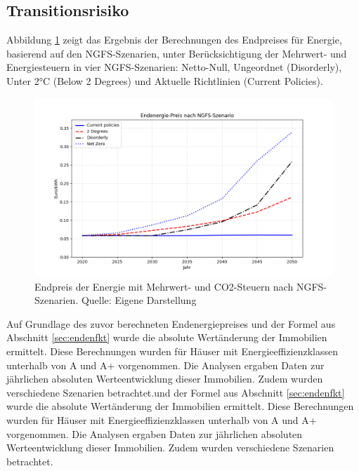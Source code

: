 








\subsection{Transitionsrisiko}
Abbildung \ref{fig:endpreis_energie} zeigt das Ergebnis der Berechnungen des Endpreises für Energie, basierend auf den NGFS-Szenarien, unter Berücksichtigung der Mehrwert- und Energiesteuern in vier NGFS-Szenarien: Netto-Null, Ungeordnet (Disorderly), Unter 2°C (Below 2 Degrees) und Aktuelle Richtlinien (Current Policies).

\begin{figure}[htbp]
    \centering
    \includegraphics[width=\textwidth]{figures/endpreis.png}
    \caption{Endpreis der Energie mit Mehrwert- und CO2-Steuern nach NGFS-Szenarien. Quelle: Eigene Darstellung}
    \label{fig:endpreis_energie}
\end{figure}
\FloatBarrier

Auf Grundlage des zuvor berechneten Endenergiepreises und der Formel aus Abschnitt \ref{sec:endenfkt} wurde die absolute Wertänderung der Immobilien ermittelt. Diese Berechnungen wurden für Häuser mit Energieeffizienzklassen unterhalb von A und A+ vorgenommen. Die Analysen ergaben Daten zur jährlichen absoluten Werteentwicklung dieser Immobilien. Zudem wurden verschiedene Szenarien betrachtet.und der Formel aus Abschnitt \ref{sec:endenfkt} wurde die absolute Wertänderung der Immobilien ermittelt. Diese Berechnungen wurden für Häuser mit Energieeffizienzklassen unterhalb von A und A+ vorgenommen. Die Analysen ergaben Daten zur jährlichen absoluten Werteentwicklung dieser Immobilien. Zudem wurden verschiedene Szenarien betrachtet.

